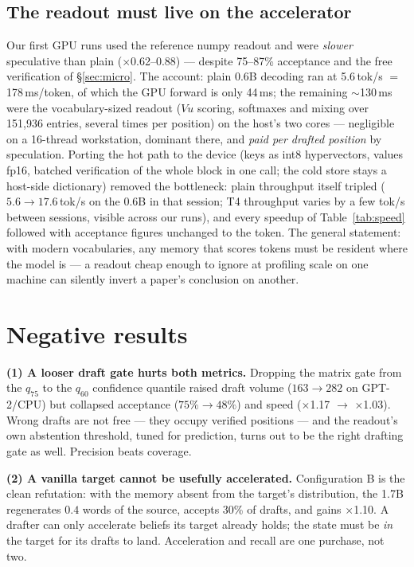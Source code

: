 \documentclass[11pt]{article}
\begin{document}
\subsection{The readout must live on the accelerator}\label{sec:ondevice}

Our first GPU runs used the reference numpy readout and were \emph{slower} speculative than plain ($\times$0.62--0.88) --- despite 75--87\% acceptance and the free verification of \S\ref{sec:micro}. The account: plain 0.6B decoding ran at 5.6\,tok/s $=$ 178\,ms/token, of which the GPU forward is only 44\,ms; the remaining $\sim$130\,ms were the vocabulary-sized readout ($V u$ scoring, softmaxes and mixing over 151{,}936 entries, several times per position) on the host's two cores --- negligible on a 16-thread workstation, dominant there, and \emph{paid per drafted position} by speculation. Porting the hot path to the device (keys as int8 hypervectors, values fp16, batched verification of the whole block in one call; the cold store stays a host-side dictionary) removed the bottleneck: plain throughput itself tripled ($5.6 \to 17.6$\,tok/s on the 0.6B in that session; T4 throughput varies by a few tok/s between sessions, visible across our runs), and every speedup of Table~\ref{tab:speed} followed with acceptance figures unchanged to the token. The general statement: with modern vocabularies, any memory that scores tokens must be resident where the model is --- a readout cheap enough to ignore at profiling scale on one machine can silently invert a paper's conclusion on another.

\section{Negative results}\label{sec:negative}

\textbf{(1) A looser draft gate hurts both metrics.} Dropping the matrix gate from the $q_{75}$ to the $q_{60}$ confidence quantile raised draft volume ($163 \to 282$ on GPT-2/CPU) but collapsed acceptance ($75\% \to 48\%$) and speed ($\times$1.17 $\to$ $\times$1.03). Wrong drafts are not free --- they occupy verified positions --- and the readout's own abstention threshold, tuned for prediction, turns out to be the right drafting gate as well. Precision beats coverage.

\textbf{(2) A vanilla target cannot be usefully accelerated.} Configuration B is the clean refutation: with the memory absent from the target's distribution, the 1.7B regenerates $0.4$ words of the source, accepts 30\% of drafts, and gains $\times$1.10. A drafter can only accelerate beliefs its target already holds; the state must be \emph{in} the target for its drafts to land. Acceleration and recall are one purchase, not two.
\end{document}
